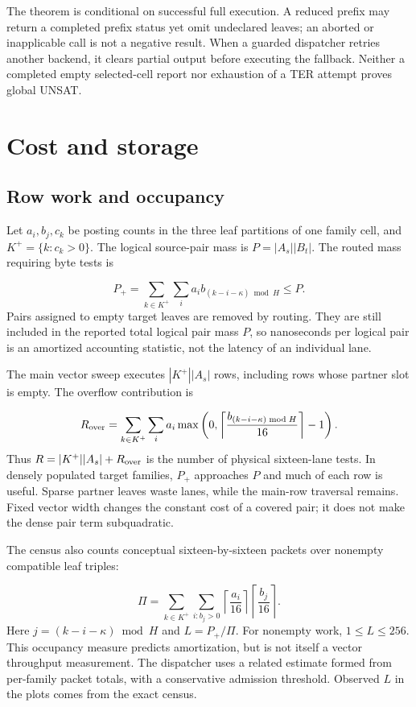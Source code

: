 \documentclass[manuscript,screen,review]{acmart}
\begin{document}
The theorem is conditional on successful full execution. A reduced prefix may return a completed prefix status yet omit undeclared leaves; an aborted or inapplicable call is not a negative result. When a guarded dispatcher retries another backend, it clears partial output before executing the fallback. Neither a completed empty selected-cell report nor exhaustion of a TER attempt proves global UNSAT.

\section{Cost and storage}
\subsection{Row work and occupancy}
Let $a_i,b_j,c_k$ be posting counts in the three leaf partitions of one family cell, and $K^+=\{k:c_k>0\}$. The logical source-pair mass is $P=|A_s||B_t|$. The routed mass requiring byte tests is

\begin{equation*}
P_+=\sum_{k\in K^+}\sum_i a_i b_{(k-i-\kappa)\bmod H}\leq P.
\end{equation*}
Pairs assigned to empty target leaves are removed by routing. They are still included in the reported total logical pair mass $P$, so nanoseconds per logical pair is an amortized accounting statistic, not the latency of an individual lane.

The main vector sweep executes $|K^+||A_s|$ rows, including rows whose partner slot is empty. The overflow contribution is

\begin{equation*}
R_{\rm over}=\sum_{k\in K^+}\sum_i a_i
\max\left(0,\left\lceil\frac{b_{(k-i-\kappa)\bmod H}}{16}\right\rceil-1\right).
\end{equation*}
Thus $R=|K^+||A_s|+R_{\rm over}$ is the number of physical sixteen-lane tests. In densely populated target families, $P_+$ approaches $P$ and much of each row is useful. Sparse partner leaves waste lanes, while the main-row traversal remains. Fixed vector width changes the constant cost of a covered pair; it does not make the dense pair term subquadratic.

The census also counts conceptual sixteen-by-sixteen packets over nonempty compatible leaf triples:

\begin{equation*}
\Pi=\sum_{k\in K^+}\sum_{i:b_j>0}
\left\lceil\frac{a_i}{16}\right\rceil
\left\lceil\frac{b_j}{16}\right\rceil. \tag{6}
\end{equation*}
Here $j=(k-i-\kappa)\bmod H$ and $L=P_+/\Pi$. For nonempty work, $1\leq L\leq256$. This occupancy measure predicts amortization, but is not itself a vector throughput measurement. The dispatcher uses a related estimate formed from per-family packet totals, with a conservative admission threshold. Observed $L$ in the plots comes from the exact census.
\end{document}
